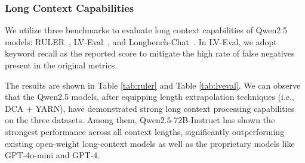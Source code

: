 \documentclass{article}
\begin{document}
\subsubsection{Long Context Capabilities}

We utilize three benchmarks to evaluate long context capabilities of Qwen2.5 models: RULER~\citep{hsieh2024ruler}, LV-Eval~\citep{yuan2024lveval}, and Longbench-Chat~\citep{longalign2024bai}. In LV-Eval, we adopt keyword recall as the reported score to mitigate the high rate of false negatives present in the original metrics.

The results are shown in Table \ref{tab:ruler} and Table \ref{tab:lveval}. We can observe that the Qwen2.5 models, after equipping length extrapolation techniques (i.e., DCA + YARN), have demonstrated strong long context processing capabilities on the three datasets. Among them, Qwen2.5-72B-Instruct has shown the strongest performance across all context lengths, significantly outperforming existing open-weight long-context models as well as the proprietary models like GPT-4o-mini and GPT-4.
\end{document}

